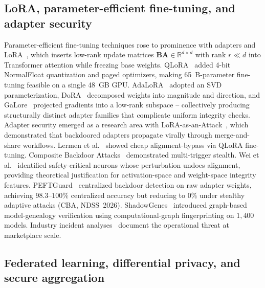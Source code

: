 \documentclass[12pt,a4paper]{article}
\theoremstyle{definition}
\theoremstyle{remark}
\newcommand{\R}{\mathbb{R}}
\begin{document}
\subsection{LoRA, parameter-efficient fine-tuning, and adapter security}

Parameter-efficient fine-tuning techniques rose to prominence with adapters and LoRA~\cite{hu2021lora}, which inserts low-rank update matrices $\mathbf{B}\mathbf{A} \in \R^{d \times d}$ with rank $r \ll d$ into Transformer attention while freezing base weights. QLoRA~\cite{dettmers2023qlora} added 4-bit NormalFloat quantization and paged optimizers, making 65~B-parameter fine-tuning feasible on a single 48~GB GPU. AdaLoRA~\cite{zhang2023adalora} adopted an SVD parameterization, DoRA~\cite{liu2024dora} decomposed weights into magnitude and direction, and GaLore~\cite{zhao2024galore} projected gradients into a low-rank subspace -- collectively producing structurally distinct adapter families that complicate uniform integrity checks. Adapter security emerged as a research area with LoRA-as-an-Attack~\cite{liu2024loraattack}, which demonstrated that backdoored adapters propagate virally through merge-and-share workflows. Lermen et al.~\cite{lermen2023lora} showed cheap alignment-bypass via QLoRA fine-tuning. Composite Backdoor Attacks~\cite{huang2024composite} demonstrated multi-trigger stealth. Wei et al.~\cite{wei2024brittleness} identified safety-critical neurons whose perturbation undoes alignment, providing theoretical justification for activation-space and weight-space integrity features. PEFTGuard~\cite{sun2025peftguard} centralized backdoor detection on raw adapter weights, achieving $98.3$--$100\%$ centralized accuracy but reducing to $0\%$ under stealthy adaptive attacks (CBA, NDSS~2026). ShadowGenes~\cite{schulz2025shadowgenes} introduced graph-based model-genealogy verification using computational-graph fingerprinting on $1{,}400$ models. Industry incident analyses~\cite{cohen2024jfrog,schulz2024silent,wang2025pickleball} document the operational threat at marketplace scale.

\subsection{Federated learning, differential privacy, and secure aggregation}
\end{document}
